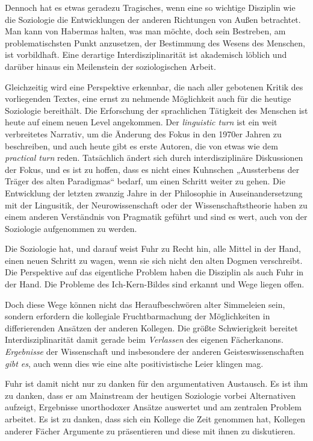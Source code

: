 \documentclass[a4paper,11pt]{article}
\begin{document}
Dennoch hat es etwas geradezu Tragisches, wenn eine so wichtige Disziplin wie
die Soziologie die Entwicklungen der anderen Richtungen von Außen betrachtet.
Man kann von Habermas halten, was man möchte, doch sein Bestreben, am
problematischsten Punkt anzusetzen, der Bestimmung des Wesens des Menschen, ist
vorbildhaft. Eine derartige Interdisziplinarität ist akademisch löblich und
darüber hinaus ein Meilenstein der soziologischen Arbeit.

Gleichzeitig wird eine Perspektive erkennbar, die nach aller gebotenen Kritik
des vorliegenden Textes, eine ernst zu nehmende Möglichkeit auch für die
heutige Soziologie bereithält. Die Erforschung der sprachlichen Tätigkeit des
Menschen ist heute auf einem neuen Level angekommen. Der \emph{linguistic turn}
ist ein weit verbreitetes Narrativ, um die Änderung des Fokus in den 1970er
Jahren zu beschreiben, und auch heute gibt es erste Autoren, die von etwas wie
dem \emph{practical turn} reden. Tatsächlich ändert sich durch
interdisziplinäre Diskussionen der Fokus, und es ist zu hoffen, dass es nicht
eines Kuhnschen „Aussterbens der Träger des alten Paradigmas“ bedarf, um einen
Schritt weiter zu gehen. Die Entwicklung der letzten zwanzig Jahre in der
Philosophie in Auseinandersetzung mit der Lingusitik, der Neurowissenschaft
oder der Wissenschaftstheorie haben zu einem anderen Verständnis von Pragmatik
geführt und sind es wert, auch von der Soziologie aufgenommen zu werden.
\clearpage

Die Soziologie hat, und darauf weist Fuhr zu Recht hin, alle Mittel in der
Hand, einen neuen Schritt zu wagen, wenn sie sich nicht den alten Dogmen
verschreibt. Die Perspektive auf das eigentliche Problem haben die Disziplin
als auch Fuhr in der Hand. Die Probleme des Ich-Kern-Bildes sind erkannt und
Wege liegen offen.

Doch diese Wege können nicht das Heraufbeschwören alter Simmeleien sein,
sondern erfordern die kollegiale Fruchtbarmachung der Möglichkeiten in
differierenden Ansätzen der anderen Kollegen. Die größte Schwierigkeit bereitet
Interdisziplinarität damit gerade beim \emph{Verlassen} des eigenen
Fächerkanons.  \emph{Ergebnisse} der Wissenschaft und insbesondere der anderen
Geisteswissenschaften \emph{gibt es}, auch wenn dies wie eine alte
positivistische Leier klingen mag.

Fuhr ist damit nicht nur zu danken für den argumentativen Austausch. Es ist ihm
zu danken, dass er am Mainstream der heutigen Soziologie vorbei Alternativen
aufzeigt, Ergebnisse unorthodoxer Ansätze auswertet und am zentralen Problem
arbeitet. Es ist zu danken, dass sich ein Kollege die Zeit genommen hat,
Kollegen anderer Fächer Argumente zu präsentieren und diese mit ihnen zu
diskutieren.
\end{document}

